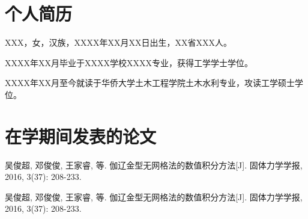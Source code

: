 \begin{cv}
    \section*{个人简历}
    XXX，女，汉族，XXXX年XX月XX日出生，XX省XXX人。

    XXXX年XX月毕业于XXXX学校XXXX专业，获得工学学士学位。

    XXXX年XX月至今就读于华侨大学土木工程学院土木水利专业，攻读工学硕士学位。
    \section*{在学期间发表的论文}
    \begin{enumerate}[{[1]}]
        \item 吴俊超, 邓俊俊, 王家睿, 等. 伽辽金型无网格法的数值积分方法[J]. 固体力学学报, 2016, 3(37): 208-233. 
        \item 吴俊超, 邓俊俊, 王家睿, 等. 伽辽金型无网格法的数值积分方法[J]. 固体力学学报, 2016, 3(37): 208-233. 
    \end{enumerate}
\end{cv}
